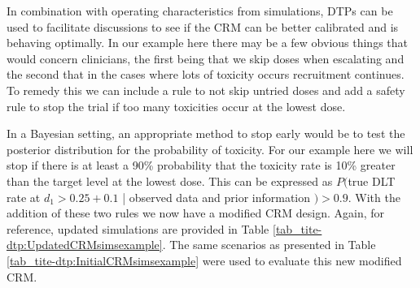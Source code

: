 In combination with operating characteristics from simulations, DTPs can be used to facilitate discussions to see if the CRM can be better calibrated and is behaving optimally. In our example here there may be a few obvious things that would concern clinicians, the first being that we skip doses when escalating and the second that in the cases where lots of toxicity occurs recruitment continues. To remedy this we can include a rule to not skip untried doses and add a safety rule to stop the trial if too many toxicities occur at the lowest dose. 

In a Bayesian setting, an appropriate method to stop early would be to test the posterior distribution for the probability of toxicity. For our example here we will stop if there is at least a 90\% probability that the toxicity rate is 10\% greater than the target level at the lowest dose. This can be expressed as $P($true DLT rate at $d_1 > 0.25 + 0.1$ | observed data and prior information $) > 0.9$. With the addition of these two rules we now have a modified CRM design. Again, for reference, updated simulations are provided in Table \ref{tab_tite-dtp:UpdatedCRMsimsexample}. The same scenarios as presented in Table \ref{tab_tite-dtp:InitialCRMsimsexample} were used to evaluate this new modified CRM. 

